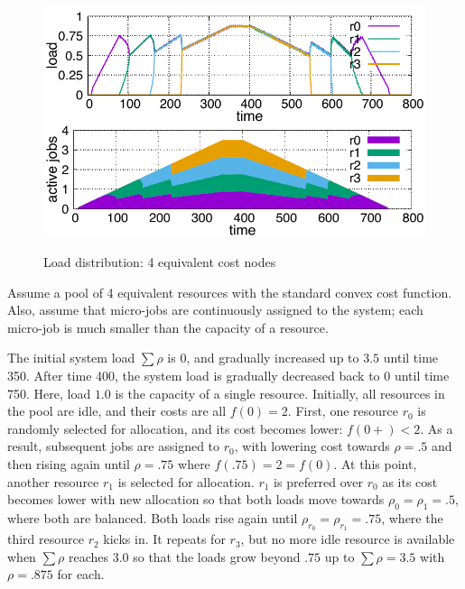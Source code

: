 \begin{figure}[tb]
  \begin{center}
    \includegraphics[width=1.0\columnwidth]{4node.pdf}
    \vspace{-2.0ex}
    \caption{Load distribution: 4 equivalent cost nodes}
    \label{fig:4node}
  \end{center}
  \hspace{0.8\columnsep}
\end{figure}

Assume a pool of 4 equivalent resources with the standard convex
cost function.
Also, assume that micro-jobs are continuously assigned to the
system; each micro-job is much smaller than the capacity of a
resource.

The initial system load $\sum \rho$ is $0$, and gradually increased up
to $3.5$ until time 350. After time 400, the system load is gradually
decreased back to $0$ until time 750.
Here, load $1.0$ is the capacity of a single resource. 
Initially, all resources in the pool are idle, and their costs are
all $f(0)= 2$.
First, one resource $r_{0}$ is randomly selected for allocation, and its
cost becomes lower: $f(0+) < 2$. As a result, subsequent jobs are
assigned to $r_{0}$, with lowering cost towards $\rho = .5$ and then
rising again until $\rho = .75$ where $f(.75) = 2 = f(0)$.
At this point, another resource $r_{1}$ is selected for allocation.
$r_{1}$ is preferred over $r_{0}$ as its cost becomes lower with new
allocation so that both loads move towards $\rho_{0} = \rho_{1} = .5$,
where both are balanced.
Both loads rise again until $\rho_{r_{0}} = \rho_{r_{1}} = .75$,
where the third resource $r_{2}$ kicks in.
It repeats for $r_{3}$, but no more idle resource is available
when $\sum \rho$ reaches $3.0$ so that the loads grow beyond $.75$
up to $\sum \rho = 3.5$ with $\rho = .875$ for each.

